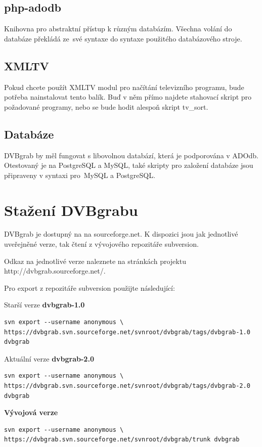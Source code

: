 \subsection{php-adodb}
Knihovna pro abstraktní přístup k různým databázím. Všechna volání do databáze překládá ze~své syntaxe do syntaxe použitého databázového stroje.
\vfil
\pagebreak
\subsection{XMLTV}
Pokud chcete použít XMLTV modul pro načítání televizního programu, bude potřeba nainstalovat tento balík. Buď v něm přímo najdete stahovací skript pro požadované programy, nebo se bude hodit alespoň skript tv\_sort.
\subsection{Databáze}
DVBgrab by měl fungovat s libovolnou databází, která je podporována v ADOdb. Otestovaný je na PostgreSQL a MySQL, také skripty pro založení databáze jsou připraveny v syntaxi pro~MySQL a PostgreSQL.
\section{Stažení DVBgrabu}
DVBgrab je dostupný na na sourceforge.net. K dispozici jsou jak jednotlivé uveřejněné verze, tak čtení z vývojového repozitáře subversion.

Odkaz na jednotlivé verze naleznete na stránkách projektu http://dvbgrab.sourceforge.net/.

Pro export z repozitáře subversion použijte následující:

Starší verze \textbf{dvbgrab-1.0}
\begin{small}\begin{verbatim}
svn export --username anonymous \
https://dvbgrab.svn.sourceforge.net/svnroot/dvbgrab/tags/dvbgrab-1.0 dvbgrab
\end{verbatim}\end{small}
Aktuální verze \textbf{dvbgrab-2.0}
\begin{small}\begin{verbatim}
svn export --username anonymous \
https://dvbgrab.svn.sourceforge.net/svnroot/dvbgrab/tags/dvbgrab-2.0 dvbgrab
\end{verbatim}\end{small}
\textbf{Vývojová verze}
\begin{small}\begin{verbatim}
svn export --username anonymous \
https://dvbgrab.svn.sourceforge.net/svnroot/dvbgrab/trunk dvbgrab
\end{verbatim}\end{small}

